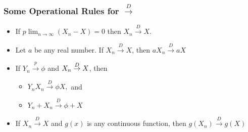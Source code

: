 \documentclass[notes=show,smaller,handout]{beamer}
\newenvironment{stepitemize}{\begin{itemize}[<+->]}{\end{itemize} }
\begin{document}
\begin{frame}%

\frametitle{Some Operational Rules for $\overset{D}{\rightarrow }$}

\begin{stepitemize}

\item If $p\lim_{n\rightarrow\infty}(X_n-X)=0$ then $X_{n}\overset{D}{\rightarrow }X$. \vspace{0.3cm}
\item Let $a$ be any real number. If $X_{n}\overset{D}{\rightarrow }X$, then
$aX_{n}\overset{D}{\rightarrow }aX$ \vspace{0.6cm}

\item If $Y_{n}\overset{p}{\rightarrow }\phi $ and $X_{n}\overset{D}{%
\rightarrow }X$, then \vspace{0.3cm}

\begin{stepitemize}
\item $Y_{n}X_{n}\overset{D}{\rightarrow }\phi X,$ and \vspace{0.3cm}

\item $Y_{n}+X_{n}\overset{D}{\rightarrow }\phi +X$ 
\end{stepitemize} \vspace{0.6cm}

\item If $X_{n}\overset{D}{\rightarrow }X$ and $g\left( x\right) $ is any
continuous function, then $g\left( X_{n}\right) \overset{D}{\rightarrow }%
g\left( X\right) $ \vspace{0.6cm}


%
\end{stepitemize}

\end{frame}
\end{document}
